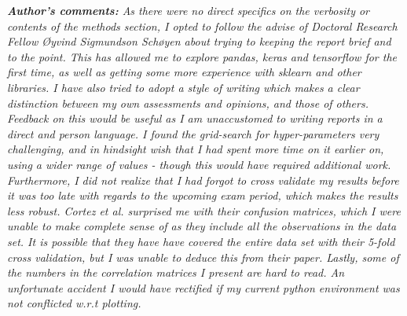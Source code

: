 \documentclass[%
oneside,                 %
final,                   %
10pt]{article}
\begin{document}
\newpage


\textit{\textbf{Author's comments:} As there were no direct specifics on the verbosity or contents of the methods section, I opted to follow the advise of Doctoral Research Fellow Øyvind Sigmundson Schøyen about trying to keeping the report brief and to the point. This has allowed me to explore pandas, keras and tensorflow for the first time, as well as getting some more experience with sklearn and other libraries. I have also tried to adopt a style of writing which makes a clear distinction between my own assessments and opinions, and those of others. Feedback on this would be useful as I am unaccustomed to writing reports in a direct and person language. I found the grid-search for hyper-parameters very challenging, and in hindsight wish that I had spent more time on it earlier on, using a wider range of values - though this would have required additional work. Furthermore, I did not realize that I had forgot to cross validate my results before it was too late with regards to the upcoming exam period, which makes the results less robust. Cortez et al. surprised me with their confusion matrices, which I were unable to make complete sense of as they include all the observations in the data set. It is possible that they have have covered the entire data set with their 5-fold cross validation, but I was unable to deduce this from their paper. Lastly, some of the numbers in the correlation matrices I present are hard to read. An unfortunate accident I would have rectified if my current python environment was not conflicted w.r.t plotting.}
\newpage
\end{document}
